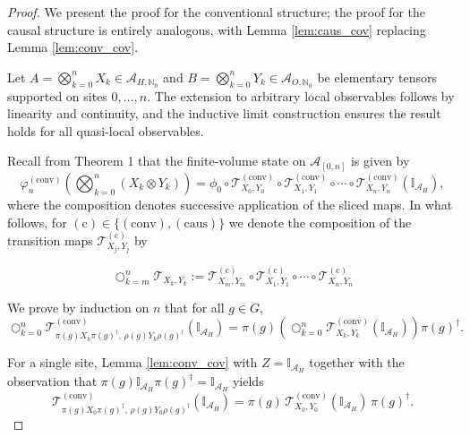 \documentclass[10pt,a4paper]{amsart}
\begin{document}
\begin{proof}
We present the proof for the conventional structure; the proof for the causal structure is entirely analogous, with Lemma \ref{lem:caus_cov} replacing Lemma \ref{lem:conv_cov}.

Let \(A = \bigotimes_{k=0}^n X_k \in \mathcal{A}_{H,\mathbb{N}_0}\) and \(B = \bigotimes_{k=0}^n Y_k \in \mathcal{A}_{O,\mathbb{N}_0}\) be elementary tensors supported on sites \(0, \dots, n\). The extension to arbitrary local observables follows by linearity and continuity, and the inductive limit construction ensures the result holds for all quasi-local observables.

Recall from Theorem 1 that the finite-volume state on \(\mathcal{A}_{[0,n]}\) is given by
\begin{equation}
\varphi_n^{(\text{conv})}\!\left( \bigotimes_{k=0}^n (X_k \otimes Y_k) \right) = \phi_0 \circ \mathcal{T}_{X_0,Y_0}^{(\text{conv})} \circ \mathcal{T}_{X_1,Y_1}^{(\text{conv})} \circ \cdots \circ \mathcal{T}_{X_n,Y_n}^{(\text{conv})}(\mathbb{I}_{\mathcal{A}_H}),
\label{eq:finite_volume_conv}
\end{equation}
where the composition denotes successive application of the sliced maps. In what follows, for $(\text{c})\in \{(\text{conv}), (\text{caus}) \}$  we denote the composition of the transition  maps $\mathcal{T}^{(\text{c})} _{X_j,Y_j}$ by

$$
\bigcirc_{k=m}^n \mathcal{T}_{X_k, Y_k} := \mathcal{T}_{X_m,Y_m}^{(\text{c})} \circ \mathcal{T}_{X_1,Y_1}^{(\text{c})} \circ \cdots \circ \mathcal{T}_{X_n,Y_n}^{(\text{c})}
$$

We prove by induction on \(n\) that for all \(g \in G\),
\begin{equation}
\bigcirc_{k=0}^n \mathcal{T}_{\pi(g) X_k \pi(g)^\dagger, \, \rho(g) Y_k \rho(g)^\dagger}^{(\text{conv})}(\mathbb{I}_{\mathcal{A}_H})
= \pi(g) \left( \bigcirc_{k=0}^n \mathcal{T}_{X_k,Y_k}^{(\text{conv})}(\mathbb{I}_{\mathcal{A}_H}) \right) \pi(g)^\dagger.
\label{eq:induction_claim}
\end{equation}


For a single site, Lemma \ref{lem:conv_cov} with \(Z = \mathbb{I}_{\mathcal{A}_H}\) together with the observation that \(\pi(g) \mathbb{I}_{\mathcal{A}_H} \pi(g)^\dagger = \mathbb{I}_{\mathcal{A}_H}\) yields
\[
\mathcal{T}_{\pi(g) X_0 \pi(g)^\dagger, \, \rho(g) Y_0 \rho(g)^\dagger}^{(\text{conv})}(\mathbb{I}_{\mathcal{A}_H})
= \pi(g) \, \mathcal{T}_{X_0,Y_0}^{(\text{conv})}(\mathbb{I}_{\mathcal{A}_H}) \, \pi(g)^\dagger.
\]



\end{proof}
\end{document}
